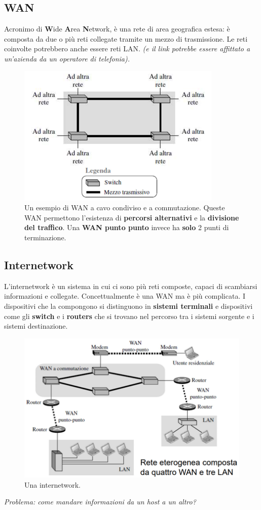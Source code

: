\documentclass[11pt,a4paper,oneside]{book}
\theoremstyle{definition}
\begin{document}
\pagebreak

\subsection{WAN}
Acronimo di \textbf{W}ide \textbf{A}rea \textbf{N}etwork, è una rete di area geografica estesa: è composta da due o più reti collegate tramite un mezzo di trasmissione. Le reti coinvolte potrebbero anche essere reti LAN. \textit{(e il link potrebbe essere affittato a un'azienda da un operatore di telefonia).}
\begin{figure}[!h]
	\includegraphics[scale=0.6]{Immagini/WAN_Switch.png}
	\centering
	\caption{Un esempio di WAN a cavo condiviso e a commutazione.\newline
		Queste WAN permettono l'esistenza di \textbf{percorsi alternativi} e la \textbf{divisione del traffico}. Una \textbf{WAN punto punto} invece ha \textbf{solo} 2 punti di terminazione.}
\end{figure}


\subsection{Internetwork}
L'internetwork è un sistema in cui ci sono più reti composte, capaci di scambiarsi informazioni e collegate. Concettualmente è una WAN ma è più complicata.
I dispositivi che la compongono si distinguono in \textbf{sistemi terminali}
e dispositivi come gli \textbf{switch} e i \textbf{routers} che si trovano nel percorso tra i sistemi sorgente e i sistemi destinazione.
\begin{figure}[!h]
	\includegraphics[scale=0.45]{Immagini/Internetwork.png}
	\centering
	\caption{Una internetwork.}
\end{figure}\newline
\textit{Problema: come mandare informazioni da un host a un altro?}
\end{document}
